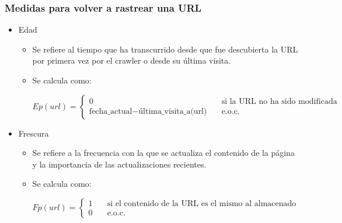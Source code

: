 \documentclass[
10pt, %
aspectratio=169, %
]{beamer}
\begin{document}
	\begin{frame}
		
		\frametitle{Medidas para volver a rastrear una URL}
		
		\begin{itemize}
			
			\item Edad
			\begin{itemize}
				\item Se refiere al tiempo que ha transcurrido desde que fue descubierta la URL por primera vez por el crawler o desde su última visita.
				\item Se calcula como:
				
				\begin{equation}
					Ep(url) = \left\{
					\begin{aligned}
						0 & \quad \text{si la URL no ha sido modificada} \\
						\text{fecha\_actual} - \text{última\_visita\_a(url)} & \quad \text{e.o.c.}
					\end{aligned} \nonumber
					\right.
				\end{equation}
				
			\end{itemize}
			
			\item Frescura
			\begin{itemize}
				\item Se refiere a la frecuencia con la que se actualiza el contenido de la página y la importancia de las actualizaciones recientes.
				\item Se calcula como:
				
				\begin{equation}
					Fp(url) = \left\{
					\begin{aligned}
						1 & \quad \text{si el contenido de la URL es el mismo al almacenado} \\
						0 & \quad \text{e.o.c.}
					\end{aligned} \nonumber
					\right.
				\end{equation}
				
			\end{itemize}
			
		\end{itemize}
		
	\end{frame}
	
\end{document}
